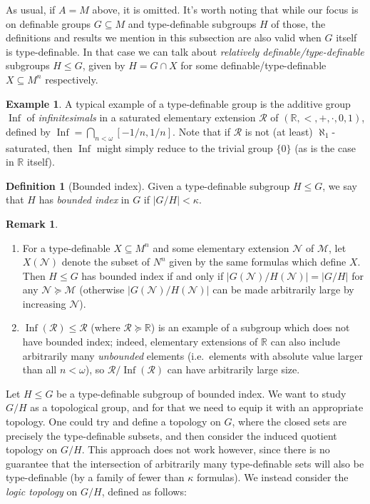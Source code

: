 \documentclass[a4paper]{report}
\newcommand{\ind}{\hspace{15pt}}
\newcommand{\R}{\mathbb{R}}
\newcommand{\M}{\mathcal{M}}
\newcommand{\N}{\mathcal{N}}
\newcommand{\Rns}{\mathcal{R}}
\DeclareMathOperator{\Inf}{Inf}
\theoremstyle{definition}
\newtheorem{defn}[thm]{Definition}
\newtheorem{exmp}[thm]{Example}
\theoremstyle{remstyle}
\newtheorem{rem}[thm]{Remark}
\begin{document}
\ind As usual, if $A=M$ above, it is omitted. It's worth noting that while our focus is on definable groups $G\subseteq M$ and type-definable subgroups $H$ of those, the definitions and results we mention in this subsection are also valid when $G$ itself is type-definable. In that case we can talk about \emph{relatively definable/type-definable} subgroups $H\leq G$, given by $H=G\cap X$ for some definable/type-definable $X\subseteq M^n$ respectively.

\begin{exmp}
	A typical example of a type-definable group is the additive group $\Inf$ of \emph{infinitesimals} in a saturated elementary extension $\Rns$ of $(\R,<,+,\cdot,0,1)$, defined by $\Inf=\bigcap_{n<\omega}[-1/n,1/n]$. Note that if $\Rns$ is not (at least) $\aleph_1$-saturated, then $\Inf$ might simply reduce to the trivial group $\{0\}$ (as is the case in $\R$ itself).
\end{exmp}

\begin{defn}[Bounded index]
	Given a type-definable subgroup $H\leq G$, we say that $H$ has \emph{bounded index} in $G$ if $|G/H|<\kappa$.
\end{defn}

\begin{rem}\
	\begin{enumerate}
		\item For a type-definable $X\subseteq M^n$ and some elementary extension $\N$ of $\M$, let $X(\N)$ denote the subset of $N^n$ given by the same formulas which define $X$. Then $H\leq G$ has bounded index if and only if $|G(\N)/H(\N)|=|G/H|$ for any $\N\succcurlyeq \M$ (otherwise $|G(\N)/H(\N)|$ can be made arbitrarily large by increasing $\N$).
		\item $\Inf(\Rns)\leq\Rns$ (where $\Rns\succeq\R$) is an example of a subgroup which does not have bounded index; indeed, elementary extensions of $\R$ can also include arbitrarily many \emph{unbounded} elements (i.e.\ elements with absolute value larger than all $n<\omega$), so $\Rns/\Inf(\Rns)$ can have arbitrarily large size.
	\end{enumerate}
\end{rem}

\ind Let $H\leq G$ be a type-definable subgroup of bounded index. We want to study $G/H$ as a topological group, and for that we need to equip it with an appropriate topology. One could try and define a topology on $G$, where the closed sets are precisely the type-definable subsets, and then consider the induced quotient topology on $G/H$. This approach does not work however, since there is no guarantee that the intersection of arbitrarily many type-definable sets will also be type-definable (by a family of fewer than $\kappa$ formulas). We instead consider the \emph{logic topology} on $G/H$, defined as follows:
\end{document}
